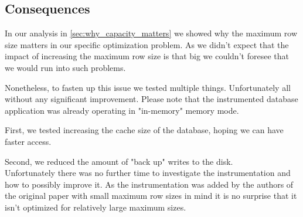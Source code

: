 \subsection{Consequences}
In our analysis in \cref{sec:why_capacity_matters} we showed why the maximum row size matters in our specific optimization problem. As we didn't expect that the impact of increasing the maximum row size is that big we couldn't foresee that we would run into such problems.

Nonetheless, to fasten up this issue we tested multiple things. Unfortunately all without any significant improvement. Please note that the instrumented database application was already operating in "in-memory" memory mode.

First, we tested increasing the cache size of the database, hoping we can have faster access.

Second, we reduced the amount of "back up" writes to the disk.\\
Unfortunately there was no further time to investigate the instrumentation and how to possibly improve it. As the instrumentation was added by the authors of the original paper with small maximum row sizes in mind it is no surprise that it isn't optimized for relatively large maximum sizes.